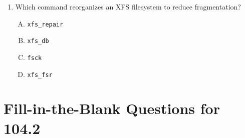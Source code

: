 \documentclass[a4paper]{report}
\begin{document}
\begin{enumerate}[1.]
    \item Which command reorganizes an XFS filesystem to reduce fragmentation?  
    \begin{enumerate}[A)]
        \item \texttt{xfs\_repair}  
        \item \texttt{xfs\_db}  
        \item \texttt{fsck}  
        \item \texttt{xfs\_fsr}  
    \end{enumerate}

\end{enumerate}

\newpage
\section*{Fill-in-the-Blank Questions for 104.2}
\end{document}
